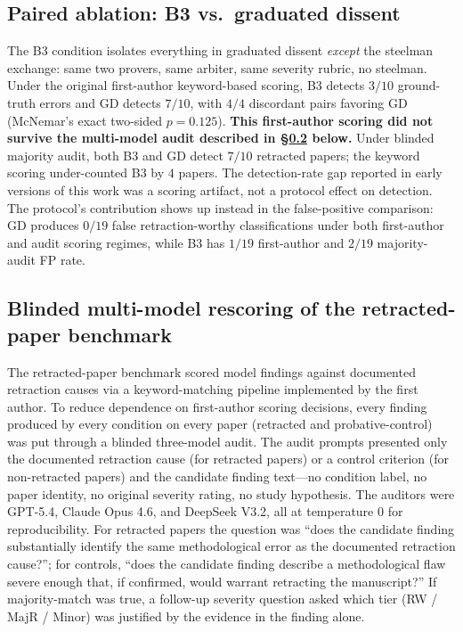 \documentclass[11pt]{article}
\theoremstyle{definition}
\begin{document}
\subsection{Paired ablation: B3 vs.~graduated dissent}

The B3 condition isolates everything in graduated dissent \emph{except} the steelman exchange: same two provers, same arbiter, same severity rubric, no steelman. Under the original first-author keyword-based scoring, B3 detects $3/10$ ground-truth errors and GD detects $7/10$, with $4/4$ discordant pairs favoring GD (McNemar's exact two-sided $p = 0.125$). \textbf{This first-author scoring did not survive the multi-model audit described in \S\ref{sec:results:retracted_audit} below.} Under blinded majority audit, both B3 and GD detect $7/10$ retracted papers; the keyword scoring under-counted B3 by $4$ papers. The detection-rate gap reported in early versions of this work was a scoring artifact, not a protocol effect on detection. The protocol's contribution shows up instead in the false-positive comparison: GD produces $0/19$ false retraction-worthy classifications under both first-author and audit scoring regimes, while B3 has $1/19$ first-author and $2/19$ majority-audit FP rate.

\subsection{Blinded multi-model rescoring of the retracted-paper benchmark}
\label{sec:results:retracted_audit}

The retracted-paper benchmark scored model findings against documented retraction causes via a keyword-matching pipeline implemented by the first author. To reduce dependence on first-author scoring decisions, every finding produced by every condition on every paper (retracted and probative-control) was put through a blinded three-model audit. The audit prompts presented only the documented retraction cause (for retracted papers) or a control criterion (for non-retracted papers) and the candidate finding text---no condition label, no paper identity, no original severity rating, no study hypothesis. The auditors were GPT-5.4, Claude Opus 4.6, and DeepSeek V3.2, all at temperature $0$ for reproducibility. For retracted papers the question was ``does the candidate finding substantially identify the same methodological error as the documented retraction cause?''; for controls, ``does the candidate finding describe a methodological flaw severe enough that, if confirmed, would warrant retracting the manuscript?'' If majority-match was true, a follow-up severity question asked which tier (RW / MajR / Minor) was justified by the evidence in the finding alone.
\end{document}
